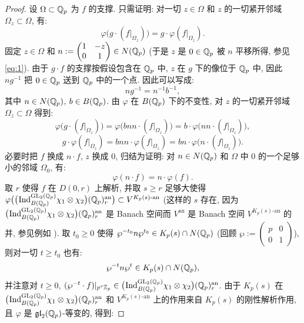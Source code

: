 \begin{proof}
设 $\Omega \subset \mathbb{Q}_p$ 为 $f$ 的支撑.
只需证明: 对一切 $z \in \Omega$ 和 $z$ 的一切紧开邻域 $\Omega_z \subset \Omega$, 有:
\begin{equation}
\label{eq:40}
\varphi\bigl(g \cdot (f|_{\Omega_z})\bigr) = g \cdot \varphi(f|_{\Omega_z}).
\end{equation}
固定 $z \in \Omega$ 和 $n := \begin{pmatrix} 1 & -z \\ 0 & 1 \end{pmatrix} \in N(\mathbb{Q}_p)$ (于是 $z$ 是 $0 \in \mathbb{Q}_p$ 被 $n$ 平移所得, 参见 \eqref{eq:1}).
由于 $g \cdot f$ 的支撑按假设包含在 $\mathbb{Q}_p$ 中, $z$ 在 $g$ 下的像位于 $\mathbb{Q}_p$ 中, 因此 $ng^{-1}$ 把 $0 \in \mathbb{Q}_p$ 送到 $\mathbb{Q}_p$ 中的一个点.
因此可以写成:
\[
ng^{-1} = n^{-1}b^{-1},
\]
其中 $n \in N(\mathbb{Q}_p)$, $b \in B(\mathbb{Q}_p)$.
由 $\varphi$ 在 $B(\mathbb{Q}_p)$ 下的不变性, 对 $z$ 的一切紧开邻域 $\Omega_z \subset \Omega$ 得到:
\[
\varphi\bigl(g \cdot (f|_{\Omega_z})\bigr) = \varphi\bigl(bnn \cdot (f|_{\Omega_z})\bigr) = b \cdot \varphi\bigl(nn \cdot (f|_{\Omega_z})\bigr),
\]
\[
g \cdot \varphi(f|_{\Omega_z}) = bnn \cdot \varphi(f|_{\Omega_z}) = bn \cdot \varphi\bigl(n \cdot (f|_{\Omega_z})\bigr).
\]
必要时把 $f$ 换成 $n \cdot f$, $z$ 换成 $0$, 归结为证明: 对 $n \in N(\mathbb{Q}_p)$ 和 $\Omega$ 中 $0$ 的一个足够小的邻域 $\Omega_0$, 有:
\begin{equation}
\label{eq:41}
\varphi(n \cdot f) = n \cdot \varphi(f).
\end{equation}
取 $r$ 使得 $f$ 在 $D(0,r)$ 上解析, 并取 $s \ge r$ 足够大使得 $\varphi\bigl(\bigl(\prescript{}{}{\mathrm{Ind}}_{B(\mathbb{Q}_p)}^{\mathrm{GL}_2(\mathbb{Q}_p)} \chi_1 \otimes \chi_2\bigr)(\mathbb{Q}_p)^{\mathrm{an}}_{r}\bigr) \subset V^{K_p(s)\text{-an}}$ (这样的 $s$ 存在, 因为 $\bigl(\prescript{}{}{\mathrm{Ind}}_{B(\mathbb{Q}_p)}^{\mathrm{GL}_2(\mathbb{Q}_p)} \chi_1 \otimes \chi_2\bigr)(\mathbb{Q}_p)^{\mathrm{an}}_{r}$ 是 Banach 空间而 $V^{\mathrm{an}}$ 是 Banach 空间 $V^{K_p(s)\text{-an}}$ 的并, 参见例如 \cite[Prop.~1 p.I.20]{ref:6}).
取 $t_0 \ge 0$ 使得 $\wp^{-t_0}n\wp^{t_0} \in K_p(s) \cap N(\mathbb{Q}_p)$ (回顾 $\wp := \begin{pmatrix} p & 0 \\ 0 & 1 \end{pmatrix}$), 则对一切 $t \ge t_0$ 也有:
\begin{equation}
\label{eq:42}
\wp^{-t}n\wp^{t} \in K_p(s) \cap N(\mathbb{Q}_p),
\end{equation}
并注意对 $t \ge 0$, $(\wp^{-t} \cdot f)|_{p^{r}\mathbb{Z}_p} \in \bigl(\prescript{}{}{\mathrm{Ind}}_{B(\mathbb{Q}_p)}^{\mathrm{GL}_2(\mathbb{Q}_p)} \chi_1 \otimes \chi_2\bigr)(\mathbb{Q}_p)^{\mathrm{an}}_{r}$.
由于 $K_p(s)$ 在 $\bigl(\prescript{}{}{\mathrm{Ind}}_{B(\mathbb{Q}_p)}^{\mathrm{GL}_2(\mathbb{Q}_p)} \chi_1 \otimes \chi_2\bigr)(\mathbb{Q}_p)^{\mathrm{an}}_{r}$ 和 $V^{K_p(s)\text{-an}}$ 上的作用来自 $K_p(s)$ 的刚性解析作用, 且 $\varphi$ 是 $\mathfrak{gl}_2(\mathbb{Q}_p)$-等变的, 得到:

\end{proof}
